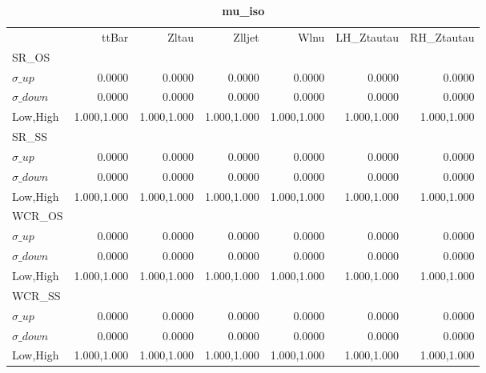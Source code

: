 \documentclass[11pt,oneside,a4paper]{article}
\begin{document}
\begin{table}
\centering
\caption{\bf{mu\_iso}}
\begin{tabular}{lrrrrrr}
& ttBar & Zltau & Zlljet & Wlnu & LH\_Ztautau & RH\_Ztautau \\
SR\_OS &  &  &  &  &  &  \\
$\sigma\_up$ & 0.0000 & 0.0000 & 0.0000 & 0.0000 & 0.0000 & 0.0000 \\
$\sigma\_down$ & 0.0000 & 0.0000 & 0.0000 & 0.0000 & 0.0000 & 0.0000 \\
Low,High & 1.000,1.000 & 1.000,1.000 & 1.000,1.000 & 1.000,1.000 & 1.000,1.000 & 1.000,1.000 \\

\hline
SR\_SS &  &  &  &  &  &  \\
$\sigma\_up$ & 0.0000 & 0.0000 & 0.0000 & 0.0000 & 0.0000 & 0.0000 \\
$\sigma\_down$ & 0.0000 & 0.0000 & 0.0000 & 0.0000 & 0.0000 & 0.0000 \\
Low,High & 1.000,1.000 & 1.000,1.000 & 1.000,1.000 & 1.000,1.000 & 1.000,1.000 & 1.000,1.000 \\

\hline
WCR\_OS &  &  &  &  &  &  \\
$\sigma\_up$ & 0.0000 & 0.0000 & 0.0000 & 0.0000 & 0.0000 & 0.0000 \\
$\sigma\_down$ & 0.0000 & 0.0000 & 0.0000 & 0.0000 & 0.0000 & 0.0000 \\
Low,High & 1.000,1.000 & 1.000,1.000 & 1.000,1.000 & 1.000,1.000 & 1.000,1.000 & 1.000,1.000 \\

\hline
WCR\_SS &  &  &  &  &  &  \\
$\sigma\_up$ & 0.0000 & 0.0000 & 0.0000 & 0.0000 & 0.0000 & 0.0000 \\
$\sigma\_down$ & 0.0000 & 0.0000 & 0.0000 & 0.0000 & 0.0000 & 0.0000 \\
Low,High & 1.000,1.000 & 1.000,1.000 & 1.000,1.000 & 1.000,1.000 & 1.000,1.000 & 1.000,1.000 \\

\hline
\end{tabular}
\end{table}
\end{document}

